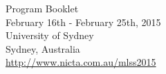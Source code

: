 \documentclass[12pt]{article}
\begin{document}
\vspace{5cm}

\begin{center}
{\Large Program Booklet} \\[0.3cm]
        February 16th - February 25th, 2015 \\
       University of Sydney\\
      Sydney, Australia\\
       \url{http://www.nicta.com.au/mlss2015}
\end{center}

\clearpage
\thispagestyle{empty}
~\clearpage

\tableofcontents


\pagestyle{fancy}

\clearpage
\label{preface}



\clearpage
\label{intro}


\clearpage
 \label{techprg}
 
 
 \clearpage
 \label{abstracts}
 
   
% 

% 

\clearpage
\label{organizers}

% 
 \clearpage
 \label{instructions}
 

\end{document}

